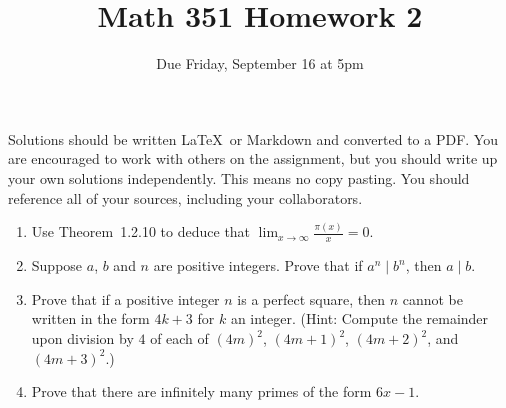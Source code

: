 \documentclass{article}
\title{Math 351 Homework 2}
\author{Due Friday, September 16 at 5pm}
\date{}
\begin{document}

\maketitle

\setlength{\parindent}{0em} %
\setlength{\parskip}{1em} %



Solutions should be written \LaTeX\ or Markdown and converted to a PDF. You are encouraged to work with others
on the assignment, but you should write up your own solutions independently. This means no copy pasting. You should
reference all of your sources, including your collaborators. 


\begin{enumerate}

\item Use Theorem~1.2.10 to deduce that $\displaystyle \lim_{x\to\infty} \frac{\pi(x)}{x} = 0$.

\item Suppose $a$, $b$ and $n$ are positive integers. Prove
that if $a^n\mid b^n$, then $a\mid b$.

\item  Prove that if a positive integer $n$ is a perfect square, then $n$ cannot be written in the form $4k+3$ for $k$ an integer. (Hint: Compute the remainder upon division by $4$ of each of $(4m)^2$, $(4m+1)^2$, $(4m+2)^2$, and $(4m+3)^2$.)

\item Prove that there are infinitely many primes of the form $6x-1$. 



\end{enumerate}
\end{document}
